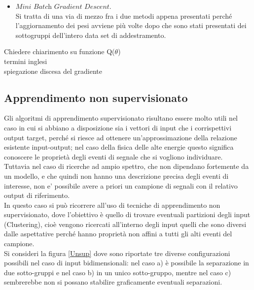 \begin{itemize}
	\item $\textit{Mini Batch Gradient Descent}$. \\
	Si tratta di una via di mezzo fra i due metodi appena presentati perché l'aggiornamento dei pesi avviene più volte dopo che sono stati presentati dei sottogruppi dell'intero data set di addestramento. 
	
\end{itemize}

\color{red}
Chiedere chiarimento su funzione Q($\theta$) \\
termini inglesi \\
spiegazione discesa del gradiente \\
\color{black}

\newpage


\subsection{Apprendimento non supervisionato}
\label{app_non_sup}

Gli algoritmi di apprendimento supervisionato risultano essere molto utili nel caso in cui si abbiano a disposizione sia i vettori di input che i corrispettivi output target, perché si riesce ad ottenere un'approssimazione della relazione esistente input-output; nel caso della fisica delle alte energie questo significa conoscere le proprietà degli eventi di segnale che si vogliono individuare.\\
Tuttavia nel caso di ricerche ad ampio spettro, che non dipendano fortemente da un modello, e che quindi non hanno una descrizione precisa degli eventi di interesse, non e' possibile avere a priori un campione di segnali con il relativo output di riferimento. \\
In questo caso si può ricorrere all'uso di tecniche di apprendimento non supervisionato, dove l'obiettivo è quello di trovare eventuali partizioni degli input (Clustering), cioè vengono ricercati all'interno degli input quelli che sono diversi dalle aspettative perché hanno proprietà non affini a tutti gli alti eventi del campione. \\
Si consideri la figura \ref{Unsup} dove sono riportate tre diverse configurazioni possibili nel caso di input bidimensionali: nel caso a) è possibile la separazione in due sotto-gruppi e nel caso b) in un unico sotto-gruppo, mentre nel caso c) sembrerebbe non si possano stabilire graficamente eventuali separazioni.

